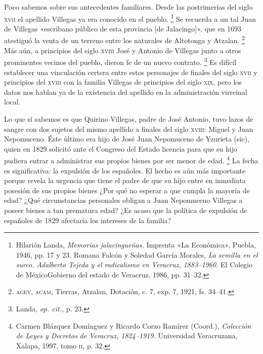 \documentclass[14pt,twoside,final]{extbook} %
\let\oldfootnote\footnote
\renewcommand\footnote[1]{%
\oldfootnote{\hspace{1mm}#1}}
\begin{document}
Poco sabemos sobre sus antecedentes familiares. Desde las postrimerías del siglo \textsc{xvii} el apellido Villegas ya era conocido en el pueblo.\footnote{Hilarión Landa, \emph{Memorias jalacingueñas.} Imprenta «La Económica», Puebla, 1946, pp. 17 y 23. Romana Falcón y Soledad García Morales, \emph{La semilla en el surco. Adalberto Tejeda y el radicalismo en Veracruz, 1883--1960.} El Colegio de México\kernedslash Gobierno del estado de Veracruz, 1986, pp. 31--32.} Se recuerda a un tal Juan de Villegas «escribano público de esta provincia [de Jalacingo]», que en 1693 atestiguó la venta de un terreno entre los naturales de Altotonga y Atzalan.\footnote{\textsc{agev, acam}, Tierras, Atzalan, Dotación, c. 7, exp. 7, 1921, fs. 34--41.} Más aún, a principios del siglo \textsc{xviii} José y Antonio de Villegas junto a otros prominentes vecinos del pueblo, dieron fe de un nuevo contrato.\footnote{Landa, \emph{op. cit.,} p. 23.} Es difícil establecer una vinculación certera entre estos personajes de finales del siglo \textsc{xvii} y principios del \textsc{xviii} con la familia Villegas de principios del siglo \textsc{xix}, pero los datos nos hablan ya de la existencia del apellido en la administración virreinal local.

Lo que sí sabemos es que Quirino Villegas, padre de José Antonio, tuvo lazos de sangre con dos sujetos del mismo apellido a finales del siglo \textsc{xviii}: Miguel y Juan Nepomuceno. Éste último era hijo de José Juan Nepomuceno de Yzurieta (sic), quien en 1829 solicitó ante el Congreso del Estado licencia para que su hijo pudiera entrar a administrar sus propios bienes por ser menor de edad.\footnote{Carmen Blázquez Domínguez y Ricardo Corzo Ramírez (Coord.), \emph{Colección de Leyes y Decretos de Veracruz, 1824--1919.} Universidad Veracruzana, Xalapa, 1997, tomo \textsc{ii}, p. 32.} La fecha es significativa: la expulsión de los españoles. El hecho es aún más importante porque revela la urgencia que tiene el padre de que su hijo entre en inmediata posesión de sus propios bienes ¿Por qué no esperar a que cumpla la mayoría de edad? ¿Qué circunstancias personales obligan a Juan Nepomuceno Villegas a poseer bienes a tan prematura edad? ¿Es acaso que la política de expulsión de españoles de 1829 afectaría los intereses de la familia?
\end{document}

